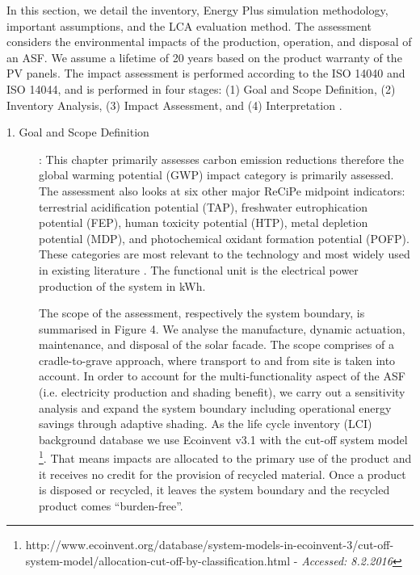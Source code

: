 
In this section, we detail the inventory, Energy Plus simulation methodology, important assumptions, and the LCA evaluation method. The assessment considers the environmental impacts of the production, operation, and disposal of an ASF. We assume a lifetime of 20 years based on the product warranty of the PV panels. The impact assessment is performed according to the ISO 14040 and ISO 14044, and is performed in four stages: (1) Goal and Scope Definition, (2) Inventory Analysis, (3) Impact Assessment, and (4) Interpretation \cite{finkbeiner2006new}.\\






\begin{description}

\item[1. Goal and Scope Definition]: This chapter primarily assesses carbon emission reductions therefore the global warming potential (GWP) impact category is primarily assessed. The assessment also looks at six other major ReCiPe midpoint indicators: terrestrial acidification potential (TAP), freshwater eutrophication potential (FEP), human toxicity potential (HTP), metal depletion potential (MDP), and photochemical oxidant formation potential (POFP). These categories are most relevant to the technology and most widely used in existing literature \cite{ortiz2009sustainability}. The functional unit is the electrical power production of the system in kWh.

The scope of the assessment, respectively the system boundary, is summarised in Figure 4. We analyse the manufacture, dynamic actuation, maintenance, and disposal of the solar facade. The scope comprises of a cradle-to-grave approach, where transport to and from site is taken into account. 
In order to account for the multi-functionality aspect of the ASF (i.e. electricity production and shading benefit), we carry out a sensitivity analysis and expand the system boundary including operational energy savings through adaptive shading. As the life cycle inventory (LCI) background database we use Ecoinvent v3.1 \cite{frischknecht2005ecoinvent} with the cut-off system model \footnote{http://www.ecoinvent.org/database/system-models-in-ecoinvent-3/cut-off-system-model/allocation-cut-off-by-classification.html   -  \textit{Accessed: 8.2.2016}}. That means impacts are allocated to the primary use of the product and it receives no credit for the provision of recycled material. Once a product is disposed or recycled, it leaves the system boundary and the recycled product comes “burden-free”.


\end{description}
